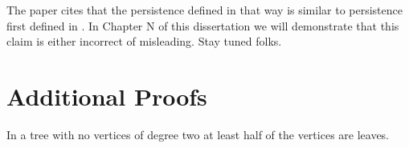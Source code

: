 


The paper \cite{ct-branch-decomp} cites that the persistence defined in that way is similar to persistence first defined in \cite{persistence-original}. In Chapter N of this dissertation we will demonstrate that this claim is either incorrect of misleading. Stay tuned folks.












\section{Additional Proofs}

\begin{lem} In a tree with no vertices of degree two at least half of the vertices are leaves. \end{lem}

